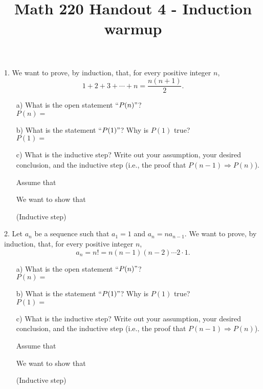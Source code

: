 \documentclass[12pt, reqno]{amsart}
\begin{document}
\title[Math 220 Handout 4 - Induction warmup]{Math 220 Handout 4 - Induction warmup}\maketitle

\thispagestyle{empty}

1. We want to prove, by induction, that, for every positive integer $n$, 
\[
1 + 2 + 3 + \cdots + n = \frac{n(n+1)}{2}.
\]
\begin{itemize}
\item [a)] What is the open statement ``$P(n)"$?\\

$P(n) = $
\vspace{1cm}
\item [b)] What is the statement ``$P(1)"$? Why is $P(1)$ true?\\

$P(1) = $
\vspace{1cm}
\item [c)] What is the inductive step? Write out your assumption, your desired conclusion, and the inductive step (i.e., the proof that $P(n-1) \Rightarrow P(n)$).

 Assume that \\\vspace{0.5cm}

 We want to show that\\\vspace{0.5cm}

 (Inductive step)\\\vspace{0.5cm}

\end{itemize}

2. Let $a_n$ be a sequence such that $a_1 = 1$ and $a_n = na_{n-1}$. We want to prove, by induction, that, for every positive integer $n$, 
\[
a_n = n! = n(n-1)(n-2)\cdots 2\cdot 1.
\]
\begin{itemize}
\item [a)] What is the open statement ``$P(n)"$?\\

$P(n) = $
\vspace{0.5cm}
\item [b)] What is the statement ``$P(1)"$? Why is $P(1)$ true?\\

$P(1) = $
  \newpage
\vspace{0.5cm}
\item [c)] What is the inductive step? Write out your assumption, your desired conclusion, and the inductive step (i.e., the proof that $P(n-1) \Rightarrow P(n)$).

 Assume that \\\vspace{0.5cm}

 We want to show that\\\vspace{0.5cm}

 (Inductive step)\\\vspace{0.5cm}

\end{itemize}
\end{document}
